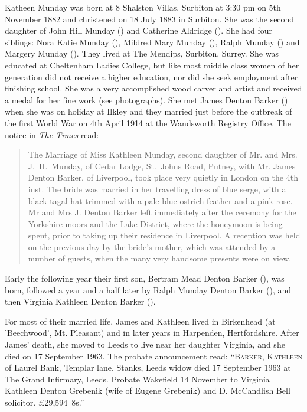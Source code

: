 
Katheen Munday was born at 8 Shalston Villas, Surbiton at 3:30 pm on 5th November 1882\cite{JHMtree, KMbirthCert, JHMbible} and christened on 18 July 1883 in Surbiton. She was the second daughter of John Hill Munday () and Catherine Aldridge (). She had four siblings: Nora Katie Munday (), Mildred Mary Munday (), Ralph Munday () and Margery Munday (). They lived at The Mendips, Surbiton, Surrey.  She was educated at Cheltenham Ladies College, but like most middle class women of her generation did not receive a higher education, nor did she seek employment after finishing school. She was a very accomplished wood carver and artist and received a medal for her fine work (see photographs). She met James Denton Barker () when she was on holiday at Ilkley and they married just before the outbreak of the first World War on 4th April 1914 at the Wandsworth Registry Office.\cite{KathleenJamesWeddingIndex} The notice in \emph{The Times} read:

\begin{quotation}
The Marriage of Miss Kathleen Munday, second daughter of Mr. and Mrs. J.\ H.\ Munday, of Cedar Lodge, St.\ Johns Road, Putney, with Mr. James Denton Barker, of Liverpool, took place very quietly in London on the 4th inst. The bride was married in her travelling dress of blue serge, with a black tagal hat trimmed with a pale blue ostrich feather and a pink rose. Mr and Mrs J. Denton Barker left immediately after the ceremony for the Yorkshire moors and the Lake District, where the honeymoon is being spent, prior to taking up their residence in Liverpool. A reception was held on the previous day by the bride's mother, which was attended by a number of guests, when the many very handsome presents were on view.
\end{quotation}

Early the following year their first son, Bertram Mead Denton Barker (), was born, followed a year and a half later by Ralph Munday Denton Barker (), and then Virginia Kathleen Denton Barker ().

For most of their married life, James and Kathleen lived in Birkenhead (at 'Beechwood', Mt. Pleasant) and in later years in Harpenden, Hertfordshire. After James' death, she moved to Leeds to live near her daughter Virginia, and she died on 17 September 1963. The probate announcement read: ``\textsc{Barker, Kathleen} of Laurel Bank, Templar lane, Stanks, Leeds widow died 17 September 1963 at The Grand Infirmary, Leeds. Probate Wakefield 14 November to Virginia Kathleen Denton Grebenik (wife of Eugene Grebenik) and D. McCandlish Bell solicitor. \pounds29,594~8s.''

